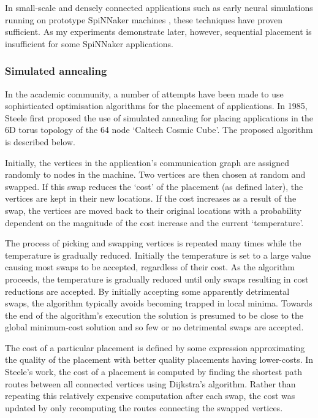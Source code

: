 				In small-scale and densely connected applications such as early neural
				simulations running on prototype SpiNNaker machines \cite{galluppi10},
				these techniques have proven sufficient.  As my experiments demonstrate
				later, however, sequential placement is insufficient for some SpiNNaker
				applications.
				
			\subsubsection{Simulated annealing}
				
				\label{sec:application-placement-summary}
				
				In the academic community, a number of attempts have been made to use
				sophisticated optimisation algorithms for the placement of
				applications. In 1985, Steele \cite{steele85} first proposed the use of
				simulated annealing for placing applications in the 6D torus topology
				of the 64 node `Caltech Cosmic Cube'. The proposed algorithm is
				described below.
				
				Initially, the vertices in the application's communication graph are
				assigned randomly to nodes in the machine. Two vertices are then chosen
				at random and swapped.  If this swap reduces the `cost' of the
				placement (as defined later), the vertices are kept in their new
				locations. If the cost increases as a result of the swap, the vertices
				are moved back to their original locations with a probability dependent
				on the magnitude of the cost increase and the current `temperature'.
				
				The process of picking and swapping vertices is repeated many times
				while the temperature is gradually reduced. Initially the temperature
				is set to a large value causing most swaps to be accepted, regardless
				of their cost. As the algorithm proceeds, the temperature is gradually
				reduced until only swaps resulting in cost reductions are accepted. By
				initially accepting some apparently detrimental swaps, the algorithm
				typically avoids becoming trapped in local minima. Towards the end of
				the algorithm's execution the solution is presumed to be close to the
				global minimum-cost solution and so few or no detrimental swaps are
				accepted.
				
				The cost of a particular placement is defined by some expression
				approximating the quality of the placement with better quality
				placements having lower-costs. In Steele's work, the cost of a
				placement is computed by finding the shortest path routes between all
				connected vertices using Dijkstra's algorithm. Rather than repeating
				this relatively expensive computation after each swap, the cost was
				updated by only recomputing the routes connecting the swapped vertices.
				

